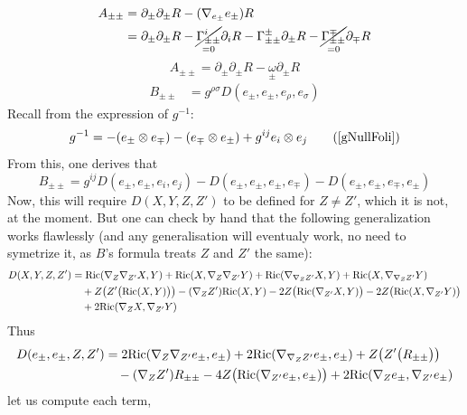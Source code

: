 \documentclass[a4paper,11pt]{article}
\numberwithin{equation}{section}
\theoremstyle{definition}
\newcommand{\R}{{\mathrm{Ric}}}
\begin{document}
\begin{align*}
    A_{\pm\pm} &= \partial_\pm \partial_\pm R - (\nabla_{e_\pm}e_\pm) R\\
    &= \partial_\pm \partial_\pm R - \underset{=0}{\cancel{\Gamma_{\pm\pm}^i}} \partial_i R - \Gamma_{\pm\pm}^\pm \partial_\pm R - \underset{=0}{\cancel{\Gamma_{\pm\pm}^\mp}} \partial_\mp R
\end{align*}
\begin{equation}
    \boxed{A_{\pm\pm} = \partial_\pm \partial_\pm R - \underset{\pm}{\omega}\partial_\pm R}
\end{equation}
\begin{align*}
    B_{\pm\pm}&= g^{\rho\sigma} D(e_\pm,e_\pm, e_\rho, e_\sigma)
\end{align*}
Recall from \cite{Art} the expression of $g^{-1}$:
\begin{equation}
g^{-1} = -(e_\pm \otimes e_\mp) - (e_\mp \otimes e_\pm) + g^{ij}e_i\otimes e_j \tag{\ref{gNullFoli}}
\end{equation}
From this, one derives that 
$$B_{\pm\pm}=g^{ij}D(e_\pm,e_\pm, e_i, e_j) - D(e_\pm,e_\pm, e_\pm, e_\mp) - D(e_\pm,e_\pm, e_\mp, e_\pm) $$
Now, this will require $D(X,Y,Z,Z')$ to be defined for $Z\ne Z'$, which it is not, at the moment. But one can check by hand that the following generalization works flawlessly (and any generalisation will eventualy work, no need to symetrize it, as $B$'s formula treats $Z$ and $Z'$ the same):
\begin{align}
    D(X,Y,Z,Z') 
    &=\R(\nabla_Z\nabla_{Z'} X ,Y )
    + \R( X ,\nabla_Z\nabla_{Z'} Y )
    + \R(\nabla_{\nabla_ZZ'} X , Y )
    + \R( X ,\nabla_{\nabla_ZZ'}Y )\notag\\
    & \quad + Z\big(Z'\big(\R(X ,Y )\big)\big)-(\nabla_Z Z')\R(X ,Y )
    -2 Z\big(\R(\nabla_{Z'} X , Y )\big)
    -2 Z\big(\R(X , \nabla_{Z'} Y )\big) \notag\\
    & \quad + 2 \R(\nabla_Z X , \nabla_{Z'} Y ) 
\end{align} Thus \begin{align}
    D(e_\pm,e_\pm,Z,Z') 
    &= 2 \R(\nabla_Z\nabla_{Z'} e_\pm ,e_\pm )
    + 2 \R(\nabla_{\nabla_ZZ'} e_\pm ,e_\pm )
    + Z\big(Z'\big(R_{\pm\pm}\big)\big)\\
    & \quad
    -(\nabla_Z Z') R_{\pm\pm}
    -4 Z\big(\R(\nabla_{Z'} e_\pm , e_\pm )\big)
    + 2 \R(\nabla_Z e_\pm , \nabla_{Z'} e_\pm )\notag
\end{align}
let us compute each term,
\end{document}
